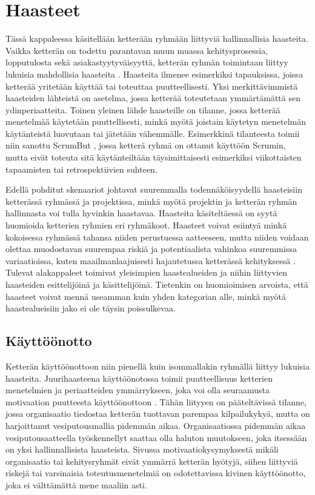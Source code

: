 \chapter{Haasteet\label{aihe-1}}

Tässä kappaleessa käsitellään ketterään ryhmään liittyviä hallinnallisia haasteita. Vaikka ketterän on todettu parantavan muun muassa kehitysprosessia, lopputulosta sekä asiakastyytyväisyyttä, ketterän ryhmän toimintaan liittyy lukuisia mahdollisia haasteita \cite{7872736}. Haasteita ilmenee esimerkiksi tapauksissa, joissa ketterää yritetään käyttää tai toteuttaa puutteellisesti. Yksi merkittävimmistä haasteiden lähteistä on asetelma, jossa ketterää toteutetaan ymmärtämättä sen ydinperiaatteita. Toinen yleinen lähde haasteille on tilanne, jossa ketterää menetelmää käytetään puuttellisesti, minkä myötä joistain käytetyn menetelmän käytänteistä luovutaan tai jätetään vähemmälle. Esimerkkinä tilanteesta toimii niin sanottu ScrumBut \cite{SCRUMBUT}, jossa ketterä ryhmä on ottanut käyttöön Scrumin, mutta eivät toteuta sitä käytänteiltään täysimittaisesti esimerkiksi viikottaisten tapaamisten tai retrospektiivien suhteen.

Edellä pohditut skenaariot johtavat suuremmalla todennäköisyydellä haasteisiin ketterässä ryhmässä ja projektissa, minkä myötä projektin ja ketterän ryhmän hallinnasta voi tulla hyvinkin haastavaa. Haasteita käsiteltäessä on syytä huomioida ketterien ryhmien eri ryhmäkoot. Haasteet voivat esiintyä minkä kokoisessa ryhmässä tahansa niiden perustuessa aatteeseen, mutta niiden voidaan olettaa muodostavan suurempaa riskiä ja potentiaalista vahinkoa suuremmissa variaatioissa, kuten maailmanlaajuisesti hajautetussa ketterässä kehityksessä \cite{ALZOUBI201622}. Tulevat alakappaleet toimivat yleisimpien haastealueiden ja niihin liittyvien haasteiden esittelijöinä ja käsittelijöinä. Tietenkin on huomioimisen arvoista, että haasteet voivat mennä useamman kuin yhden kategorian alle, minkä myötä haastealueisiin jako ei ole täysin poissulkevaa. 


\section{Käyttöönotto}

Ketterän käyttöönottoon niin pienellä kuin isommallakin ryhmällä liittyy lukuisia haasteita. Juurihaasteena käyttöönotossa toimii puutteellisuus ketterien menetelmien ja periaatteiden ymmärrykseen, joka voi olla seuraamusta motivaation puutteesta käyttöönottoon \cite{GREGORY201692}. Tähän liityyen on pääteltävissä tilanne, jossa organisaatio tiedostaa ketterän tuottavan parempaa kilpailukykyä, mutta on harjoittanut vesiputousmallia \cite{MCKNIGHT2014168} pidemmän aikaa. Organisaatiossa pidemmän aikaa vesiputousaatteella työskennellyt saattaa olla haluton muutokseen, joka itsessään on yksi hallinnallisista haasteista. Sivussa motivaatiokysymyksestä mikäli organisaatio tai kehitysryhmät eivät ymmärrä ketterän hyötyjä, siihen liittyviä riskejä tai varsinaisia toteutusmenetelmiä on odotettavissa kivinen käyttöönotto, joka ei välttämättä mene maaliin asti.

